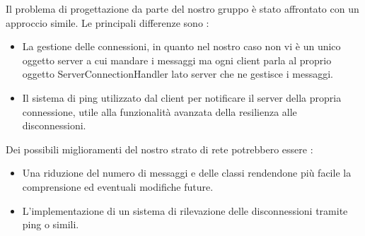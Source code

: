 \documentclass[12pt]{article}
\begin{document}
Il problema di progettazione da parte del nostro gruppo è stato affrontato con un approccio simile. 
Le principali differenze sono :
\begin{itemize}
    \item La gestione delle connessioni, in quanto nel nostro caso non vi è un unico oggetto server a cui mandare i messaggi ma ogni client parla al proprio oggetto ServerConnectionHandler lato server che ne gestisce i messaggi.  
    \item Il sistema di ping utilizzato dal client per notificare il server della propria connessione, utile alla funzionalità avanzata della resilienza alle disconnessioni. 
\end{itemize}


Dei possibili miglioramenti del nostro strato di rete potrebbero essere :

\begin{itemize}
    \item Una riduzione del numero di messaggi e delle classi rendendone più facile la comprensione ed eventuali modifiche future.
    \item L'implementazione di un sistema di rilevazione delle disconnessioni tramite ping o simili. 
\end{itemize}
\end{document}
